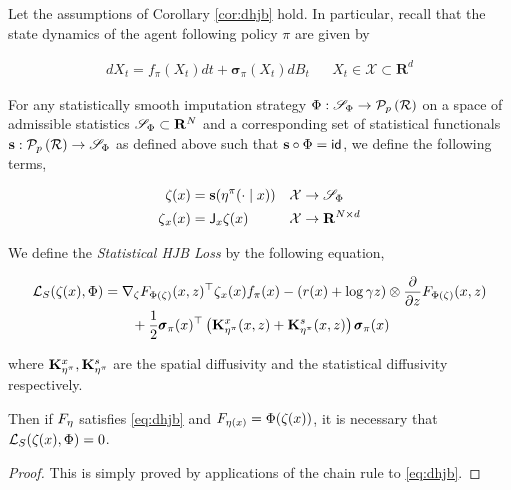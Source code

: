 \begin{theorem}\label{thm:shjb}
  Let the assumptions of Corollary
  \ref{cor:dhjb} hold. In particular, recall that the state dynamics of the
  agent following policy $\pi$ are given by

  \begin{align*}
    dX_t = f_\pi(X_t)dt + \pmb{\sigma}_\pi(X_t)dB_t &&
    X_t\in\mathcal{X}\subset\mathbf{R}^d
  \end{align*}

  For any statistically smooth
  imputation strategy $\Phi:\statsdomain{\Phi}\to\probset{\returnspace}$ on a
  space of admissible statistics $\statsdomain{\Phi}\subset\mathbf{R}^N$ and
  a corresponding set of statistical functionals
  ${\mathbf{s}:\probset{\returnspace}\to\statsdomain{\Phi}}$
  as defined above such that $\mathbf{s}\circ\Phi=\identity$, we define the
  following terms,

  \begin{align}
    \statistics(x) &= \mathbf{s}(\returnmeasure^\pi(\cdot\mid x)) &&
    \mathcal{X}\to\statsdomain{\Phi}\\
    \statistics{}_x(x) &= \jacobian_x\statistics(x) &&
    \mathcal{X}\to\mathbf{R}^{N\times d}
  \end{align}

  We define the \emph{Statistical HJB Loss} by the following equation,

  \begin{equation}
    \label{eq:shjb}
    \begin{aligned}
      \mathcal{L}_S(\statistics(x), \Phi) &=
      \measurement{\nabla_{\statistics}\cdf[\Phi(\statistics)](x,
      z)}{\statistics{}_x(x)}{f_\pi(x)} -(r(x) + \log\gamma
      z)\otimes\partialderiv{}{z}\cdf[\Phi(\statistics)](x, z)\\
      &\qquad
      +\frac{1}{2}\quadraticform{\pmb{\sigma}_\pi(x)}{\left(\statediffuse(x,z) +
        \statsdiffuse(x,z)\right)}
    \end{aligned}
  \end{equation}

  where $\statediffuse, \statsdiffuse$ are the spatial diffusivity and the
  statistical diffusivity respectively.

  Then if $\cdf[\returnmeasure]$ satisfies \eqref{eq:dhjb} and
  $\cdf[\returnmeasure(x)] = \Phi(\statistics(x))$, it is necessary
  that $\mathcal{L}_S(\statistics(x), \Phi) = 0$.
\end{theorem}
\begin{proof}
  This is simply proved by applications of the chain rule to \eqref{eq:dhjb}.
\end{proof}

